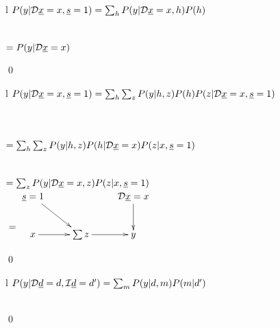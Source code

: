 \begin{claim}
\label{cl-decTransportTwo}
\decTransportTwo
\end{claim}
\proof
\begin{longtable}{l}
\color{red}
$P(y|{\cal D} {\underline{x}}=x, {\underline{s}}=1)=
\sum_h P(y|{\cal D}{\underline{x}}=x, h)P(h)$
\\
\\
\xymatrix{\\=}
\\
\color{red}
$=P(y|{\cal D}{\underline{x}}=x)$
\\
\xymatrix{=}
\end{longtable}
\qed
\begin{claim}
\label{cl-decTransportThree}
\decTransportThree
\end{claim}
\proof

\begin{longtable}{l}
\color{red}
$P(y|{\cal D}{\underline{x}}=x, {\underline{s}}=1)=
\sum_h
\sum_z P(y|h, z)P(h)
P(z|{\cal D}{\underline{x}}=x, {\underline{s}}=1)$
\\
\\
\\
\\
\color{red}
$=\sum_h\sum_z P(y|h,z)P(h|{\cal D}{\underline{x}}=x)
P(z|x, {\underline{s}}=1)$
\\
\\
\xymatrix{\\=}
\\
\color{red}
$=\sum_z P(y|{\cal D}{\underline{x}}=x, z)P(z|x, {\underline{s}}=1)$
\\
$\xymatrix{\\=}\xymatrix{
\rvs=1\ar[rd]
&&\cald\rvx=x\ar[d]
\\
x\ar[r]
&\sum z\ar[r]
&y
}$
\end{longtable}
\qed

\begin{claim}
\label{cl-decMediationSimple}
\decMediationSimple
\end{claim}
\proof
\begin{longtable}{l}
\color{red}
$P(y|{\cal D}{\underline{d}}=d,{\cal I}{\underline{d}}=d')=
\sum_{m}
P(y|d,m)P(m|d')$
\\
\\
\end{longtable}
\qed

